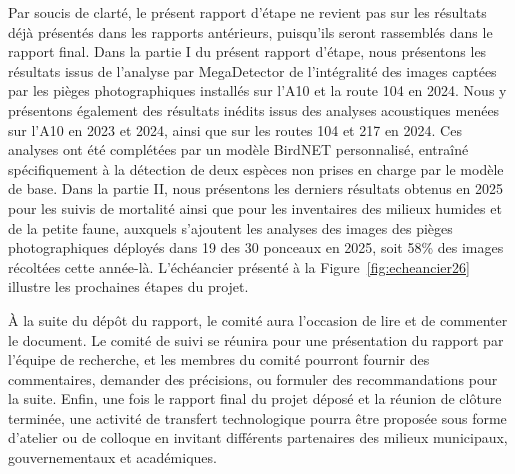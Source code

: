 Par soucis de clarté, le présent rapport d'étape ne revient pas sur les résultats déjà présentés dans les rapports antérieurs, puisqu'ils seront rassemblés dans le rapport final. Dans la partie I du présent rapport d'étape, nous présentons les résultats issus de l'analyse par MegaDetector de l'intégralité des images captées par les pièges photographiques installés sur l'A10 et la route 104 en 2024. Nous y présentons également des résultats inédits issus des analyses acoustiques menées sur l'A10 en 2023 et 2024, ainsi que sur les routes 104 et 217 en 2024. Ces analyses ont été complétées par un modèle BirdNET personnalisé, entraîné spécifiquement à la détection de deux espèces non prises en charge par le modèle de base. Dans la partie II, nous présentons les derniers résultats obtenus en 2025 pour les suivis de mortalité ainsi que pour les inventaires des milieux humides et de la petite faune, auxquels s'ajoutent les analyses des images des pièges photographiques déployés dans 19 des 30 ponceaux en 2025, soit 58\% des images récoltées cette année-là. L'échéancier présenté à la Figure~\ref{fig:echeancier26} illustre les prochaines étapes du projet. 

À la suite du dépôt du rapport, le comité aura l’occasion de lire et de commenter le document. Le comité de suivi se réunira pour une présentation du rapport par l'équipe de recherche, et les membres du comité pourront fournir des commentaires, demander des précisions, ou formuler des recommandations pour la suite. Enfin, une fois le rapport final du projet déposé et la réunion de clôture terminée, une activité de transfert technologique pourra être proposée sous forme d'atelier ou de colloque en invitant différents partenaires des milieux municipaux, gouvernementaux et académiques.
